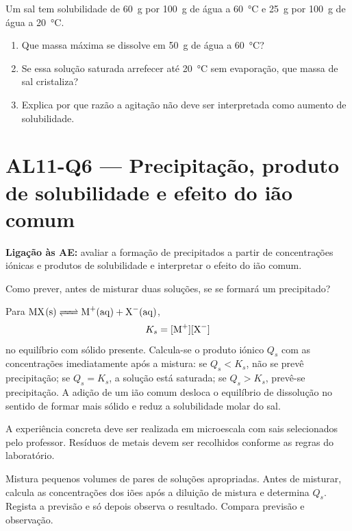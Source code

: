 \documentclass[11pt,a4paper,openany]{book}
\newcounter{exercicio}[chapter]
\renewcommand{\theexercicio}{\thechapter.\arabic{exercicio}}
\newenvironment{exercicio}[1][]%
{\refstepcounter{exercicio}%
\begin{tcolorbox}[breakable,colback=white,colframe=eublue!70,
 title={Exercício \theexercicio\if\relax\detokenize{#1}\relax\else\ --- #1\fi},fonttitle=\bfseries]}%
{\end{tcolorbox}}
\newcommand{\LigAE}[1]{\textbf{Ligação às AE:} #1}
\begin{document}
\begin{exercicio}[Cristalização por arrefecimento]
Um sal tem solubilidade de \SI{60}{g} por \SI{100}{g} de água a \SI{60}{\celsius} e \SI{25}{g} por \SI{100}{g} de água a \SI{20}{\celsius}.
\begin{enumerate}[label=\alph*)]
\item Que massa máxima se dissolve em \SI{50}{g} de água a \SI{60}{\celsius}?
\item Se essa solução saturada arrefecer até \SI{20}{\celsius} sem evaporação, que massa de sal cristaliza?
\item Explica por que razão a agitação não deve ser interpretada como aumento de solubilidade.
\end{enumerate}
\end{exercicio}

\section{AL11-Q6 — Precipitação, produto de solubilidade e efeito do ião comum}
\LigAE{avaliar a formação de precipitados a partir de concentrações iónicas e produtos de solubilidade e interpretar o efeito do ião comum.}

\begin{questao}
Como prever, antes de misturar duas soluções, se se formará um precipitado?
\end{questao}

\begin{fundamento}
Para $\ce{MX(s) <=> M+(aq) + X-(aq)}$,
\[
K_s=[\ce{M+}][\ce{X-}]
\]
no equilíbrio com sólido presente. Calcula-se o produto iónico $Q_s$ com as concentrações imediatamente após a mistura: se $Q_s<K_s$, não se prevê precipitação; se $Q_s=K_s$, a solução está saturada; se $Q_s>K_s$, prevê-se precipitação. A adição de um ião comum desloca o equilíbrio de dissolução no sentido de formar mais sólido e reduz a solubilidade molar do sal.
\end{fundamento}

\begin{seguranca}
A experiência concreta deve ser realizada em microescala com sais selecionados pelo professor. Resíduos de metais devem ser recolhidos conforme as regras do laboratório.
\end{seguranca}

\begin{metodo}
Mistura pequenos volumes de pares de soluções apropriadas. Antes de misturar, calcula as concentrações dos iões após a diluição de mistura e determina $Q_s$. Regista a previsão e só depois observa o resultado. Compara previsão e observação.
\end{metodo}
\end{document}

